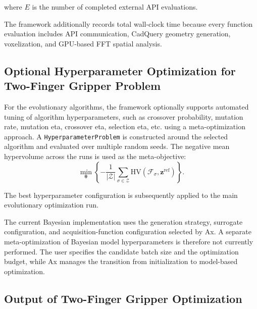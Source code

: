 where $E$ is the number of completed external API evaluations.

The framework additionally records total wall-clock time because every function evaluation includes
API communication, CadQuery geometry generation, voxelization, and GPU-based FFT spatial analysis.

\subsection{Optional Hyperparameter Optimization for Two-Finger Gripper Problem}
\label{sec:two_finger_hyperparameter_optimization}

For the evolutionary algorithms, the framework optionally supports automated tuning of algorithm hyperparameters, such as crossover probability,
mutation rate, mutation eta, crossover eta, selection eta, etc. using a meta-optimization approach. A \texttt{HyperparameterProblem} is constructed
around the selected algorithm and evaluated over multiple random seeds. The negative mean hypervolume across the runs is used as the meta-objective:
\begin{equation}
    \min_{\boldsymbol{\theta}}
    \left\{
        -\frac{1}{|\mathcal{Z}|}
        \sum_{\sigma \in \mathcal{Z}}
        \mathrm{HV}\!\left(\mathcal{F}_{\sigma},\mathbf{z}^{\mathrm{ref}}\right)
    \right\}.
\end{equation}

The best hyperparameter configuration is subsequently applied to the main evolutionary optimization
run.

The current Bayesian implementation uses the generation strategy, surrogate configuration, and
acquisition-function configuration selected by Ax. A separate meta-optimization of Bayesian model
hyperparameters is therefore not currently performed. The user specifies the candidate batch size
and the optimization budget, while Ax manages the transition from initialization to model-based
optimization.

\subsection{Output of Two-Finger Gripper Optimization}
\label{sec:two_finger_output}

